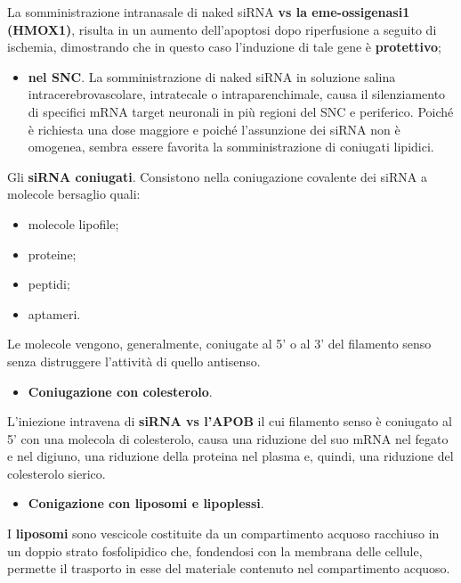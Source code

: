 \documentclass[11pt]{book}
\begin{document}
La somministrazione intranasale di naked siRNA \textbf{vs la
eme-ossigenasi1 (HMOX1)}, risulta in un aumento dell'apoptosi dopo
riperfusione a seguito di ischemia, dimostrando che in questo caso
l'induzione di tale gene è \textbf{protettivo};

\begin{itemize}
\itemsep1pt\parskip0pt
\item
  \textbf{nel SNC}. La somministrazione di naked siRNA in soluzione
  salina intracerebrovascolare, intratecale o intraparenchimale, causa
  il silenziamento di specifici mRNA target neuronali in più regioni del
  SNC e periferico. Poiché è richiesta una dose maggiore e poiché
  l'assunzione dei siRNA non è omogenea, sembra essere favorita la
  somministrazione di coniugati lipidici.
\end{itemize}

Gli \textbf{siRNA coniugati}. Consistono nella coniugazione covalente
dei siRNA a molecole bersaglio quali:

\begin{itemize}
\itemsep1pt\parskip0pt
\item
  molecole lipofile;
\item
  proteine;
\item
  peptidi;
\item
  aptameri.
\end{itemize}

Le molecole vengono, generalmente, coniugate al 5' o al 3' del filamento
senso senza distruggere l'attività di quello antisenso.

\begin{itemize}
\itemsep1pt\parskip0pt
\item
  \textbf{Coniugazione con colesterolo}.
\end{itemize}

L'iniezione intravena di \textbf{siRNA vs l'APOB} il cui filamento senso
è coniugato al 5' con una molecola di colesterolo, causa una riduzione
del suo mRNA nel fegato e nel digiuno, una riduzione della proteina nel
plasma e, quindi, una riduzione del colesterolo sierico.

\begin{itemize}
\itemsep1pt\parskip0pt
\item
  \textbf{Conigazione con liposomi e lipoplessi}.
\end{itemize}

I \textbf{liposomi} sono vescicole costituite da un compartimento
acquoso racchiuso in un doppio strato fosfolipidico che, fondendosi con
la membrana delle cellule, permette il trasporto in esse del materiale
contenuto nel compartimento acquoso.
\end{document}
